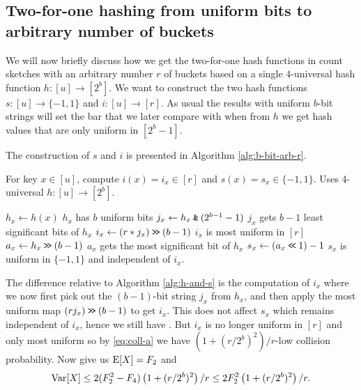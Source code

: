 \subsection{Two-for-one hashing from uniform bits to arbitrary number of buckets}
We will now briefly discuss how we get the two-for-one hash
functions in count sketches with an arbitrary number $r$ of buckets based
on a single $4$-universal hash function $h:[u]\to [2^b]$.  We want to
construct the two hash functions $s:[u]\to\{-1,1\}$ and
$i:[u]\to[r]$. As usual the results with uniform $b$-bit strings will
set the bar that we later compare with when from $h$ we get hash values that
are only uniform in $[2^b-1]$.

The construction of $s$ and $i$ is presented in 
Algorithm \ref{alg:b-bit-arb-r}.
\begin{algorithm}[H]
   \caption{For key $x\in [u]$, compute $i(x)=i_x\in[r]$ and $s(x)=s_x\in\{-1,1\}$.
   \newline
    Uses 4-universal $h:[u]\to [2^b]$.}
   \label{alg:b-bit-arb-r}
   \begin{algorithmic}
      \State $h_x\gets h(x)$
      \Comment $h_x$ has $b$ uniform bits
      \State $j_x\gets h_x\mathbin{\texttt{\&}}(2^{b-1}-1)$
      \Comment $j_x$ gets $b-1$ least significant bits of $h_x$
      \State $i_x\gets (r*j_x)\mathbin{\texttt{>\!>}} (b-1)$
      \Comment $i_x$ is most uniform in $[r]$
      \State $a_x\gets h_x\mathbin{\texttt{>\!>}} (b-1)$
      \Comment $a_x$ gets the most significant bit of $h_x$
      \State $s_x\gets (a_x\mathbin{\texttt{<\!<}} 1)-1$
      \Comment $s_x$ is uniform in $\{-1,1\}$ and independent of $i_x$.
   \end{algorithmic}
\end{algorithm}
The difference relative to Algorithm \ref{alg:h-and-s} is the computation
of $i_x$ where we now first pick out the $(b-1)$-bit string $j_x$ from
$h_x$, and then apply the most uniform map $(rj_x)\mathbin{\texttt{>\!>}} (b-1)$
to get $i_x$. This does not affect $s_x$ which remains independent
of $i_x$, hence we still have .
But $i_x$ is no longer uniform in $[r]$ and only most uniform
so by \eqref{eq:coll-a} we have $(1 + (r/2^b)^2)/r$-low collision probability.
Now  give us $\operatorname*{E}[X] = F_2$ and
\begin{equation}\label{eq:Var-b-bit-arb-r}
   \operatorname*{Var}[X] \le 2(F_2^2 - F_4)\left(1+(r/2^b)^2\right)/r
      \le 2 F_2^2\left(1 + (r/2^b)^2 \right)/r .
\end{equation}

